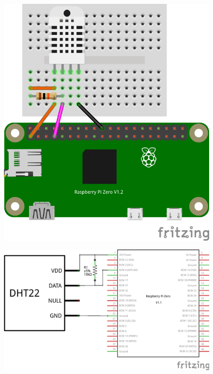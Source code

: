 

\begin{figure}[ht]
  \centering
  \includegraphics[scale=1.0, angle=-90]{images/DHT22_Steckplatine.png}	
  \label{DHT22_Steckplatine}
\end{figure}


\begin{figure}[ht]
	\centering
	\includegraphics[scale=0.25]{images/DHT22_Schaltplan.png}	
	\label{DHT22_Steckplatine}
\end{figure}


